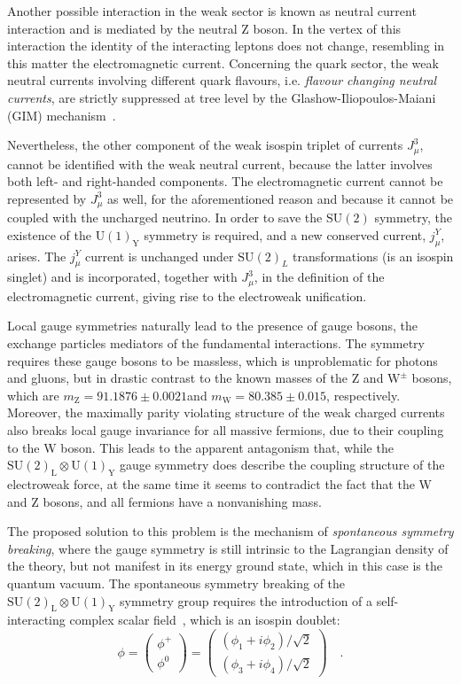 Another possible interaction in the weak sector is known as neutral current interaction and is mediated by the neutral Z boson. In the vertex of this interaction the identity of the interacting leptons does not change, resembling in this matter the electromagnetic current. Concerning the quark sector, the weak neutral currents involving different quark flavours, i.e. \emph{flavour changing neutral currents}, are strictly suppressed at tree level by the Glashow-Iliopoulos-Maiani (GIM) mechanism~\cite{Glashow:1970gm}.

Nevertheless, the other component of the weak isospin triplet of currents $J_\mu^3$, cannot be identified with the weak neutral current, because the latter involves both left- and right-handed components. The electromagnetic current cannot be represented by $J_\mu^3$ as well, for the aforementioned reason and because it cannot be coupled with the uncharged neutrino. In order to save the $\mathrm{SU(2)}$ symmetry, the existence of the $\mathrm{U(1)_Y}$ symmetry is required, and a new conserved current, $j_\mu^Y$, arises. The $j_\mu^Y$ current is unchanged under $\mathrm{SU(2)}_L$ transformations (is an isospin singlet) and is incorporated, together with $J_\mu^3$, in the definition of the electromagnetic current, giving rise to the electroweak unification.

Local gauge symmetries naturally lead to the presence of gauge bosons, the exchange particles mediators of the fundamental interactions. The symmetry requires these gauge bosons to be massless, which is unproblematic for photons and gluons, but in drastic contrast to the known masses of the Z and $\mathrm{W^\pm}$ bosons, which are $m_\mathrm{Z} = 91.1876 \pm 0.0021$\GeV and $m_\mathrm{W} = 80.385 \pm 0.015$\GeV, respectively. Moreover, the maximally parity violating structure of the weak charged currents also breaks local gauge invariance for all massive fermions, due to their coupling to the W boson. This leads to the apparent antagonism that, while the $\mathrm{SU(2)_L \otimes U(1)_Y}$ gauge symmetry does describe the coupling structure of the electroweak force, at the same time it seems to contradict the fact that the W and Z bosons, and all fermions have a nonvanishing mass. 

The proposed solution to this problem is the mechanism of \emph{spontaneous symmetry breaking}, where the gauge symmetry is still intrinsic to the Lagrangian density of the theory, but not manifest in its energy ground state, which in this case is the quantum vacuum. The spontaneous symmetry breaking of the $\mathrm{SU(2)_L \otimes U(1)_Y}$ symmetry group requires the introduction of a self-interacting complex scalar field~\cite{Wolf:2015kua}, which is an isospin doublet:
\begin{equation}
\phi = \begin{pmatrix} \phi^+       \\ \phi^0      \end{pmatrix} = \begin{pmatrix} (\phi_1+i\phi_2)/\sqrt{2}       \\ (\phi_3+i\phi_4)/\sqrt{2}      \end{pmatrix} \quad .
\end{equation}

